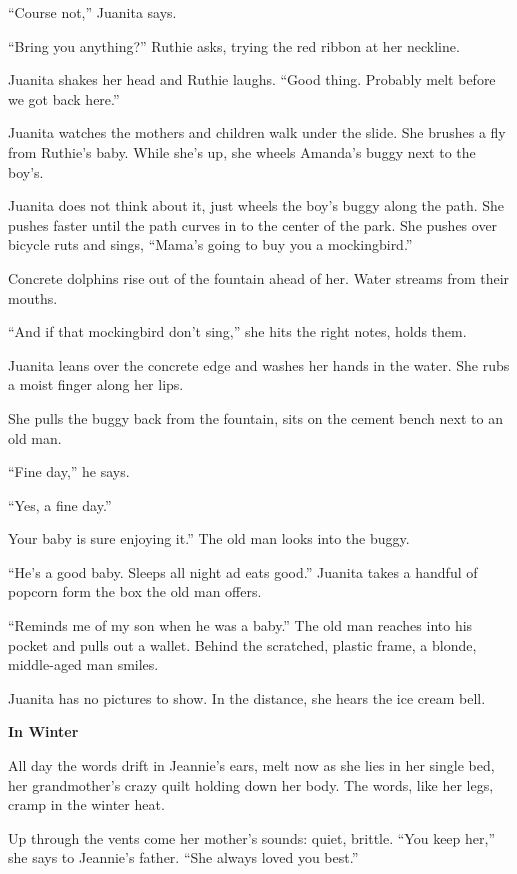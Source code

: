 \documentclass[
]{article}
\begin{document}
``Course not,'' Juanita says.

``Bring you anything?'' Ruthie asks, trying the red ribbon at her
neckline.

Juanita shakes her head and Ruthie laughs. ``Good thing. Probably melt
before we got back here.''

Juanita watches the mothers and children walk under the slide. She
brushes a fly from Ruthie's baby. While she's up, she wheels Amanda's
buggy next to the boy's.

Juanita does not think about it, just wheels the boy's buggy along the
path. She pushes faster until the path curves in to the center of the
park. She pushes over bicycle ruts and sings, ``Mama's going to buy you
a mockingbird.''

Concrete dolphins rise out of the fountain ahead of her. Water streams
from their mouths.

``And if that mockingbird don't sing,'' she hits the right notes, holds
them.

Juanita leans over the concrete edge and washes her hands in the water.
She rubs a moist finger along her lips.

She pulls the buggy back from the fountain, sits on the cement bench
next to an old man.

``Fine day,'' he says.

``Yes, a fine day.''

Your baby is sure enjoying it.'' The old man looks into the buggy.

``He's a good baby. Sleeps all night ad eats good.'' Juanita takes a
handful of popcorn form the box the old man offers.

``Reminds me of my son when he was a baby.'' The old man reaches into
his pocket and pulls out a wallet. Behind the scratched, plastic frame,
a blonde, middle-aged man smiles.

Juanita has no pictures to show. In the distance, she hears the ice
cream bell.

\textbf{\hfill\break
}

\textbf{In Winter}

All day the words drift in Jeannie's ears, melt now as she lies in her
single bed, her grand­mother's crazy quilt holding down her body. The
words, like her legs, cramp in the winter heat.

Up through the vents come her mother's sounds: quiet, brittle. ``You
keep her,'' she says to Jeannie's father. ``She always loved you best.''
\end{document}
